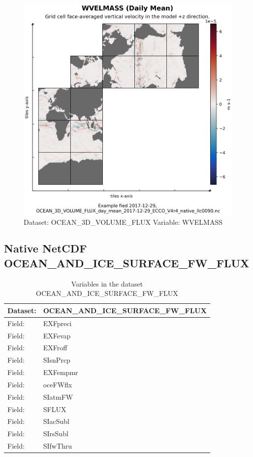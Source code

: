 \begin{figure}[H]
\centering
\includegraphics[width=\textwidth]{../images/plots/native_plots/Ocean_Three-Dimensional_Volume_Fluxes/WVELMASS.png}
\caption{Dataset: OCEAN\_3D\_VOLUME\_FLUX Variable: WVELMASS}
\label{tab:table-OCEAN_3D_VOLUME_FLUX_WVELMASS-Plot}
\end{figure}
\pagebreak
\subsection{Native NetCDF OCEAN\_AND\_ICE\_SURFACE\_FW\_FLUX}
\newp
\begin{longtable}{|p{}|p{}|}
\caption{Variables in the dataset OCEAN\_AND\_ICE\_SURFACE\_FW\_FLUX}
\label{tab:table-OCEAN_AND_ICE_SURFACE_FW_FLUX-fields} \\ 
\hline \endhead \hline \endfoot
\rowcolor{lightgray} \textbf{Dataset:} & \textbf{OCEAN\_AND\_ICE\_SURFACE\_FW\_FLUX} \\ \hline
Field: &EXFpreci \\ \hline
Field: &EXFevap \\ \hline
Field: &EXFroff \\ \hline
Field: &SIsnPrcp \\ \hline
Field: &EXFempmr \\ \hline
Field: &oceFWflx \\ \hline
Field: &SIatmFW \\ \hline
Field: &SFLUX \\ \hline
Field: &SIacSubl \\ \hline
Field: &SIrsSubl \\ \hline
Field: &SIfwThru \\ \hline
\end{longtable}

